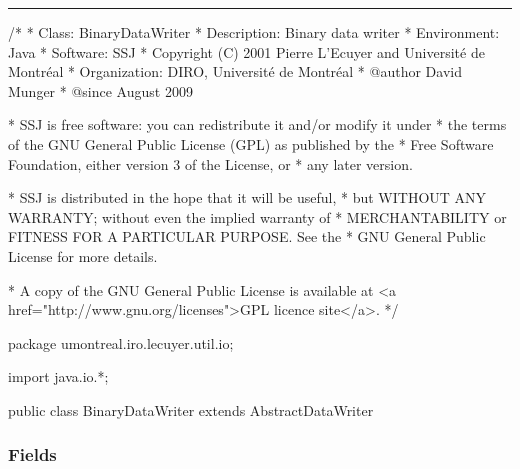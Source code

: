 \bigskip\hrule

\begin{code}
\begin{hide}
/*
 * Class:        BinaryDataWriter
 * Description:  Binary data writer
 * Environment:  Java
 * Software:     SSJ 
 * Copyright (C) 2001  Pierre L'Ecuyer and Université de Montréal
 * Organization: DIRO, Université de Montréal
 * @author       David Munger 
 * @since        August 2009

 * SSJ is free software: you can redistribute it and/or modify it under
 * the terms of the GNU General Public License (GPL) as published by the
 * Free Software Foundation, either version 3 of the License, or
 * any later version.

 * SSJ is distributed in the hope that it will be useful,
 * but WITHOUT ANY WARRANTY; without even the implied warranty of
 * MERCHANTABILITY or FITNESS FOR A PARTICULAR PURPOSE.  See the
 * GNU General Public License for more details.

 * A copy of the GNU General Public License is available at
   <a href="http://www.gnu.org/licenses">GPL licence site</a>.
 */
\end{hide}
package umontreal.iro.lecuyer.util.io;
\begin{hide}
import java.io.*;
\end{hide}

public class BinaryDataWriter extends AbstractDataWriter \begin{hide} {
   protected DataOutputStream out;
   
   /**
    * Utility method to write string data.
    *
    */    
   protected void writeStringData(String s) throws IOException {
      if (s != null) {
         out.writeInt(s.length());
         out.writeBytes(s);
      }
      else {
         out.writeInt(0);
      }
   }
   
   /**
    * Starts a new field by writing its label.
    *
    * @param label   name of the field (can be {@code null})
    *
    */
   protected void writeLabel(String label) throws IOException {
      out.writeByte(TYPECHAR_LABEL);
      writeStringData(label);
   }
\end{hide}
\end{code}

\subsubsection*{Fields}

